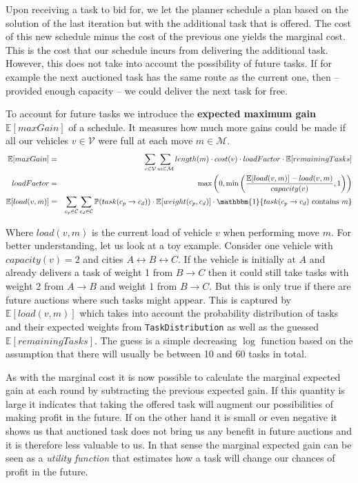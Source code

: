 \documentclass[11pt]{article}
\begin{document}
  Upon receiving a task to bid for, we let the planner schedule a plan based on
  the solution of the last iteration but with the additional task that is offered.
  The cost of this new schedule minus the cost of the previous one yields the
  marginal cost. This is the cost that our schedule incurs from delivering the
  additional task. However, this does not take into account the possibility of
  future tasks. If for example the next auctioned task has the same route as
  the current one, then -- provided enough capacity -- we could deliver the next
  task for free.

  To account for future tasks we introduce the \textbf{expected maximum gain}
  $\mathbb{E}[maxGain]$ of a schedule. It measures how much more gains could be
  made if all our vehicles $v \in \mathcal{V}$ were full at each move $m \in
  \mathcal{M}$.
  \begin{eqnarray*}
    \mathbb{E}[maxGain] &=&
    \sum_{v \in \mathcal{V}}
    \sum_{m \in \mathcal{M}}
    length(m) \cdot cost(v) \cdot
    loadFactor\cdot
    \mathbb{E}[remainingTasks]
    \\
    loadFactor &=& \max\left(0, \min\left(
    \frac{\mathbb{E}[load(v, m)] - load(v, m)}{capacity(v)},
    1 \right)\right)
    \\
    \mathbb{E}[load(v, m)] &=&
    \sum_{c_p \in \mathcal{C}} \sum_{c_d \in \mathcal{C}}
    \mathbb{P}(task(c_p \rightarrow c_d))
    \cdot \mathbb{E}[weight(c_p, c_d)] \cdot
    \mathbbm{1}\{task(c_p \rightarrow c_d) \text{ contains } m\}
  \end{eqnarray*}

  Where $load(v, m)$ is the current load of vehicle $v$ when performing move $m$.
  For better understanding, let us look at a toy example. Consider one vehicle
  with $capacity(v) = 2$ and cities $A \leftrightarrow B \leftrightarrow C$. If
  the vehicle is initially at $A$ and already delivers a task of weight 1 from $B
  \rightarrow C$ then it could still take tasks with weight 2 from $A \rightarrow
  B$ and weight 1 from $B \rightarrow C$. But this is only true if there are
  future auctions where such tasks might appear. This is captured by
  $\mathbb{E}[load(v, m)]$ which takes into account the probability distribution
  of tasks and their expected weights from \texttt{TaskDistribution} as well as
  the guessed $\mathbb{E}[remainingTasks]$. The guess is a simple decreasing
  $\log$ function based on the assumption that there will usually be between 10
  and 60 tasks in total.

  As with the marginal cost it is now possible to calculate the marginal expected
  gain at each round by subtracting the previous expected gain. If this quantity
  is large it indicates that taking the offered task will augment our
  possibilities of making profit in the future. If on the other hand it is small
  or even negative it shows us that auctioned task does not bring us any benefit
  in future auctions and it is therefore less valuable to us. In that sense the
  marginal expected gain can be seen as a \textit{utility function} that estimates
  how a task will change our chances of profit in the future.
\end{document}

